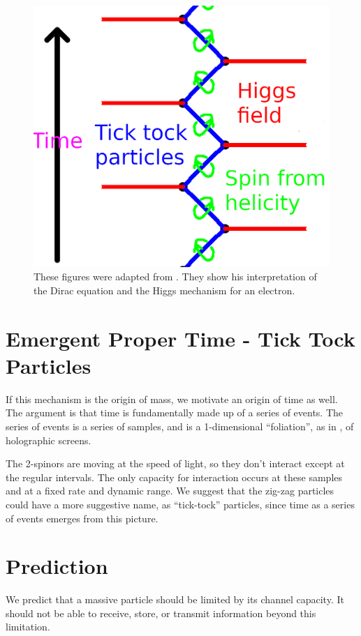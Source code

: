 \documentclass[12pt,a4paper]{article}
\begin{document}
\begin{figure}[h]
\centering
\includegraphics[scale=1.0]{zig_zag_color.png}
\caption{These figures were adapted from \cite{penrose}.  They show his interpretation of the Dirac equation and the Higgs mechanism for an electron.}
\label{zigzag}
\end{figure}

\section{Emergent Proper Time - Tick Tock Particles}
If this mechanism is the origin of mass, we motivate an origin of time as well.  The argument is that time is fundamentally made up of a series of events. The series of events is a series of samples, and is a 1-dimensional ``foliation'', as in \cite{entropic}, of holographic screens. 

The 2-spinors are moving at the speed of light, so they don't interact except at the regular intervals. The only capacity for interaction occurs at these samples and at a fixed rate and dynamic range.  We suggest that the zig-zag particles could have a more suggestive name, as ``tick-tock'' particles, since time as a series of events emerges from this picture.

\section{Prediction}
We predict that a massive particle should be limited by its channel capacity.  It should not be able to receive, store, or transmit information beyond this limitation.



\end{document}
